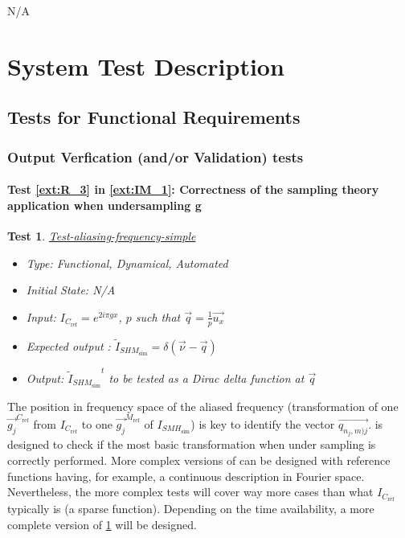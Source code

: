 \documentclass[12pt, titlepage]{article}
\newtheorem{Test}{Test}
\begin{document}
N/A
\section{System Test Description}
	
\subsection{Tests for Functional Requirements}
\renewcommand{\labelitemi}{$\star$}

\subsubsection{Output Verfication (and/or Validation) tests}
	
\paragraph{Test \cref{ext:R_3} in \cref{ext:IM_1}: Correctness of the sampling theory application when undersampling g}

\begin{Test}\normalfont\underline{Test-aliasing-frequency-simple}
\label{aliasing-frequency-simple}
\begin{itemize}
\item Type: Functional, Dynamical, Automated
\item Initial State: N/A
\item Input: $I_{C_{\text{ref}}}=e^{2i\pi gx}$, $p$ such that $\overrightarrow{q}=\frac{1}{p}\vec{u_x}$
\item Expected output : $\widetilde{I}_{\mathit{SHM}_{\text{sim}}}=\delta(\vec{\nu}-\vec{q})$
\item Output: ${\widetilde{I}_{\mathit{SHM}_{\text{sim}}}}^{t}$ to be tested as a Dirac delta function at $\overrightarrow{q}$
\end{itemize}
\end{Test}
		
The position in frequency space of the aliased frequency (transformation of one $\overrightarrow{g_{j}}^{C_{\text{ref}}}$ from $I_{C_{\text{ref}}}$ to one $\overrightarrow{g_{j}}^{M_{\text{ref}}}$ of $I_{\mathit{SMH}_{\text{sim}}}$) is key to identify the vector $\overrightarrow{q_{n_j,m)j}}$.  is designed to check if the most basic transformation when under sampling is correctly performed. More complex versions of  can be designed with reference functions having, for example, a continuous description in Fourier space. Nevertheless, the more complex tests will cover way more cases than what $I_{C_{\text{ref}}}$ typically is (a sparse function). Depending on the time availability, a more complete version of \cref{aliasing-frequency-simple} will be designed.
		
\end{document}
